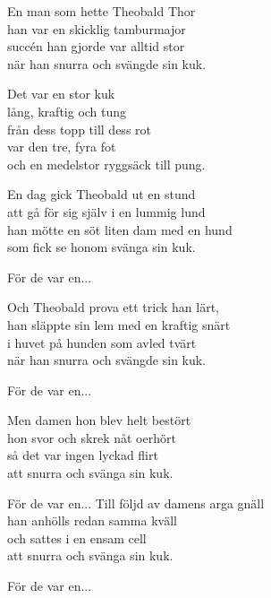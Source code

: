 \vspace{10pt}
En man som hette Theobald Thor\\
han var en skicklig tamburmajor\\
succén han gjorde var alltid stor\\
när han snurra och svängde sin kuk.\par
\vspace{8pt}
Det var en stor kuk\\
lång, kraftig och tung\\
från dess topp till dess rot\\
var den tre, fyra fot\\
och en medelstor ryggsäck till pung.\par
\vspace{8pt}
En dag gick Theobald ut en stund\\
att gå för sig själv i en lummig lund\\
han mötte en söt liten dam med en hund\\
som fick se honom svänga sin kuk.\par
\vspace{8pt}
För de var en...\par
\vspace{8pt}
Och Theobald prova ett trick han lärt,\\
han släppte sin lem med en kraftig snärt\\
i huvet på hunden som avled tvärt\\
när han snurra och svängde sin kuk.\par
\vspace{8pt}
För de var en...\par
\vspace{8pt}
Men damen hon blev helt bestört\\
hon svor och skrek nåt oerhört\\
så det var ingen lyckad flirt\\
att snurra och svänga sin kuk.\par
\vspace{8pt}
För de var en...
\newpage
Till följd av damens arga gnäll\\
han anhölls redan samma kväll\\
och sattes i en ensam cell\\
att snurra och svänga sin kuk.\par
\vspace{8pt}
För de var en...\par
